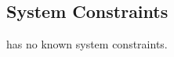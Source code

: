 \subsection{System Constraints}\label{sec_systemConstraints}
\progname{} has no known system constraints.

